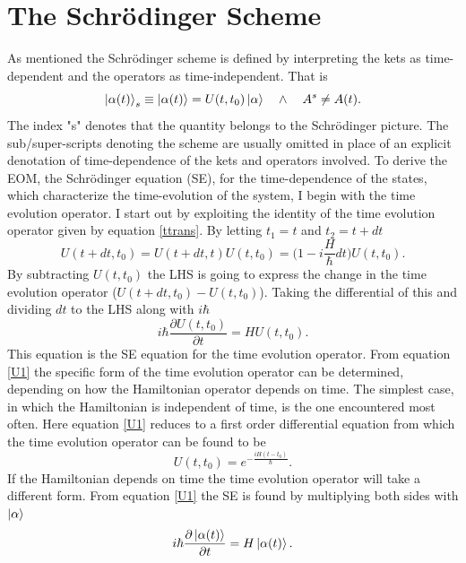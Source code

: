 \section{The Schrödinger Scheme}
As mentioned the Schrödinger scheme is defined by interpreting the kets as time-dependent and the operators as time-independent. That is
\begin{equation}
	\ket{\alpha(t)}_s\equiv\ket{\alpha(t)}=U(t,t_0)\ket{\alpha} \quad \wedge \quad A^{s}\neq A(t).
\end{equation}   
The index "s" denotes that the quantity belongs to the Schrödinger picture. The sub/super-scripts denoting the scheme are usually omitted in place of an explicit denotation of time-dependence of the kets and operators involved.
To derive the EOM, the Schrödinger equation (SE), for the time-dependence of the states, which characterize the time-evolution of the system, I begin with the time evolution operator. I start out by exploiting the identity of the time evolution operator given by equation \eqref{ttrans}. By letting $t_1=t$ and $t_2=t+dt$
\begin{equation}
	U(t+dt,t_0)=U(t+dt,t)U(t,t_0)=\bigg(1-i\frac{H}{\hbar}dt\bigg)U(t,t_0).
\end{equation}  
By subtracting $U(t,t_0)$ the LHS is going to express the change in the time evolution operator ($U(t+dt,t_0)-U(t,t_0)$). Taking the differential of this and dividing $dt$ to the LHS along with $i\hbar$
\begin{equation}
	i\hbar\frac{\partial U(t,t_0)}{\partial t}=HU(t,t_0).
	\label{U1}
\end{equation}  
This equation is the SE equation for the time evolution operator. From equation \eqref{U1} the specific form of the time evolution operator can be determined, depending on how the Hamiltonian operator depends on time. The simplest case, in which the Hamiltonian is independent of time, is the one encountered most often. Here equation \eqref{U1} reduces to a first order differential equation from which the time evolution operator can be found to be
\begin{equation}
	U(t,t_0)=e^{-\frac{iH(t-t_0)}{\hbar}}.
	\label{TEO}
\end{equation} 
If the Hamiltonian depends on time the time evolution operator will take a different form.\newline
From equation \eqref{U1} the SE is found by multiplying both sides with $\ket{\alpha}$
\begin{equation}
	i\hbar\frac{\partial \ket{\alpha(t)}}{\partial t}=H\ket{\alpha(t)}.
	\label{SE}
\end{equation} 
